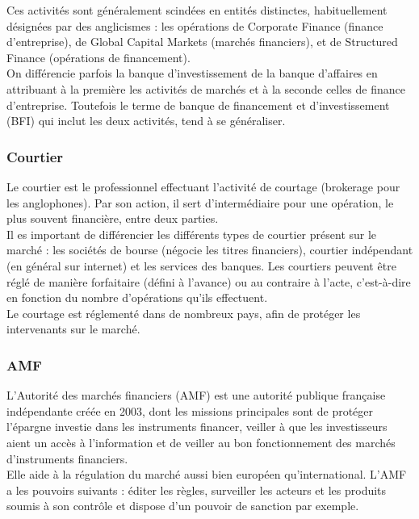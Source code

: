 Ces activités sont généralement scindées en entités distinctes, habituellement désignées par des anglicismes : les opérations de Corporate Finance (finance d'entreprise), de Global Capital Markets (marchés financiers), et de Structured Finance (opérations de financement). \\

On différencie parfois la banque d'investissement de la banque d'affaires en attribuant à la première les activités de marchés et à la seconde celles de finance d'entreprise. Toutefois le terme de banque de financement et d'investissement (BFI) qui inclut les deux activités, tend à se généraliser. 

\subsubsection{Courtier}
Le courtier est le professionnel effectuant l'activité de courtage (brokerage pour les anglophones). Par son action, il sert d'intermédiaire pour une opération, le plus souvent financière, entre deux parties. \\

Il es important de différencier les différents types de courtier présent sur le marché : les sociétés de bourse (négocie les titres financiers), courtier indépendant (en général sur internet) et les services des banques. Les courtiers peuvent être réglé de manière forfaitaire (défini à l'avance) ou au contraire à l'acte, c'est-à-dire en fonction du nombre d'opérations qu'ils effectuent. \\

Le courtage est réglementé dans de nombreux pays, afin de protéger les intervenants sur le marché.


\subsubsection{AMF}
L'Autorité des marchés financiers (AMF) est une autorité publique française indépendante créée en 2003, dont les missions principales sont de protéger l'épargne investie dans les instruments financer, veiller à que les investisseurs aient un accès à l'information et de veiller au bon fonctionnement des marchés d'instruments financiers. \\

Elle aide à la régulation du marché aussi bien européen qu'international. L'AMF a les pouvoirs suivants : éditer les règles, surveiller les acteurs et les produits soumis à son contrôle et dispose d'un pouvoir de sanction par exemple. 